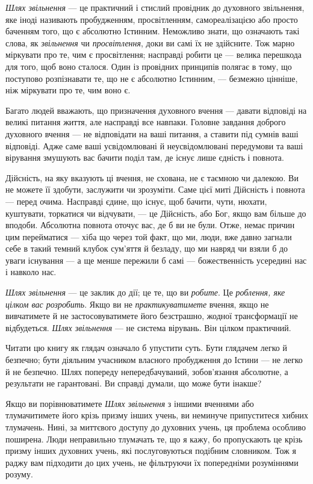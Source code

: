 \emph{Шлях звільнення} — це практичний і стислий провідник до духовного звільнення, яке іноді називають пробудженням, просвітленням, самореалізацією або просто баченням того, що є абсолютно Істинним. Неможливо знати, що означають такі слова, як \emph{звільнення} чи \emph{просвітлення}, доки ви самі їх не здійсните. Тож марно міркувати про те, чим є просвітлення; насправді робити це — велика перешкода для того, щоб воно сталося. Один із провідних принципів полягає в тому, що поступово розпізнавати те, що не є абсолютно Істинним, — безмежно цінніше, ніж міркувати про те, чим воно є.

Багато людей вважають, що призначення духовного вчення — давати відповіді на великі питання життя, але насправді все навпаки. Головне завдання доброго духовного вчення — не відповідати на ваші питання, а ставити під сумнів ваші відповіді. Адже саме ваші усвідомлювані й неусвідомлювані передумови та ваші вірування змушують вас бачити поділ там, де існує лише єдність і повнота.

Дійсність, на яку вказують ці вчення, не схована, не є таємною чи далекою. Ви не можете її здобути, заслужити чи зрозуміти. Саме цієї миті Дійсність і повнота — перед очима. Насправді єдине, що існує, щоб бачити, чути, нюхати, куштувати, торкатися чи відчувати, — це Дійсність, або Бог, якщо вам більше до вподоби. Абсолютна повнота оточує вас, де б ви не були. Отже, немає причин цим перейматися — хіба що через той факт, що ми, люди, вже давно загнали себе в такий темний клубок сум'яття й безладу, що ми навряд чи взяли б до уваги існування — а ще менше пережили б самі — божественність усередині нас і навколо нас.

\emph{Шлях звільнення} — це заклик до дії; це те, що ви \emph{робите}. Це \emph{роблення, яке цілком вас розробить}. Якщо ви не \emph{практикуватимете} вчення, якщо не вивчатимете й не застосовуватимете його безстрашно, жодної трансформації не відбудеться. \emph{Шлях звільнення} — не система вірувань. Він цілком практичний.

Читати цю книгу як глядач означало б упустити суть. Бути глядачем легко й безпечно; бути діяльним учасником власного пробудження до Істини — не легко й не безпечно. Шлях попереду непередбачуваний, зобов'язання абсолютне, а результати не гарантовані. Ви справді думали, що може бути інакше?

Якщо ви порівнюватимете \emph{Шлях звільнення} з іншими вченнями або тлумачитимете його крізь призму інших учень, ви неминуче припуститеся хибних тлумачень. Нині, за миттєвого доступу до духовних учень, ця проблема особливо поширена. Люди неправильно тлумачать те, що я кажу, бо пропускають це крізь призму інших духовних учень, які послуговуються подібним словником. Тож я раджу вам підходити до цих учень, не фільтруючи їх попередніми розуміннями розуму.


